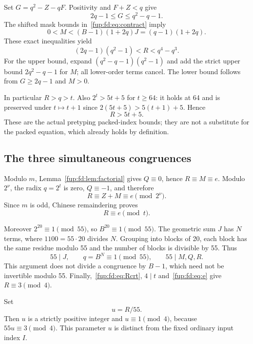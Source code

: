 \documentclass[11pt,letterpaper]{article}
\theoremstyle{definition}\newtheorem{definition}[theorem]{Definition}
\theoremstyle{remark}\newtheorem{remark}[theorem]{Remark}
\begin{document}
Set $G=q^2-Z-qF$. Positivity and $F+Z<q$ give
\[
 2q-1\le G\le q^2-q-1.
\]
The shifted mask bounds in~\eqref{fup:fd:eq:contract} imply
\[
 0<M<(B-1)(1+2q)J=(q-1)(1+2q).
\]
These exact inequalities yield
\begin{equation}\label{fup:fd:eq:Rbounds}
 (2q-1)(q^2-1)<R<q^4-q^3.
\end{equation}
For the upper bound, expand $(q^2-q-1)(q^2-1)$ and add the strict upper bound $2q^2-q-1$ for $M$; all lower-order terms cancel. The lower bound follows from $G\ge2q-1$ and $M>0$.

In particular $R>q>t$. Also $2^t>5t+5$ for $t\ge64$: it holds at 64 and is preserved under $t\mapsto t+1$ since $2(5t+5)>5(t+1)+5$. Hence
\begin{equation}\label{fup:fd:eq:Rlarge}
 R>5t+5.
\end{equation}
These are the actual pretyping packed-index bounds; they are not a substitute for the packed equation, which already holds by definition.

\subsection{The three simultaneous congruences}
Modulo $m$, Lemma~\ref{fup:fd:lem:factorial} gives $Q\equiv0$, hence $R\equiv M\equiv e$. Modulo $2^\nu$, the radix $q=2^t$ is zero, $Q\equiv-1$, and therefore
\[
 R\equiv Z+M\equiv e\pmod{2^\nu}.
\]
Since $m$ is odd, Chinese remaindering proves
\begin{equation}\label{fup:fd:eq:Rcrt}
 R\equiv e\pmod t.
\end{equation}

Moreover $2^{20}\equiv1\pmod{55}$, so $B^{20}\equiv1\pmod{55}$. The geometric sum $J$ has $N$ terms, where $1100=55\cdot20$ divides $N$. Grouping into blocks of 20, each block has the same residue modulo 55 and the number of blocks is divisible by 55. Thus
\[
 55\mid J,\qquad q=B^N\equiv1\pmod{55},
 \qquad55\mid M,Q,R.
\]
This argument does not divide a congruence by $B-1$, which need not be invertible modulo 55. Finally,~\eqref{fup:fd:eq:Rcrt}, $4\mid t$ and~\eqref{fup:fd:eq:e} give $R\equiv3\pmod4$.

Set
\begin{equation}\label{fup:fd:eq:u}
 u=R/55.
\end{equation}
Then $u$ is a strictly positive integer and $u\equiv1\pmod4$, because $55u\equiv3\pmod4$. This parameter $u$ is distinct from the fixed ordinary input index $I$.
\end{document}
